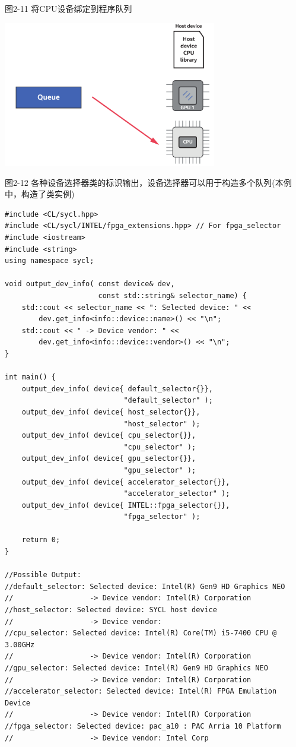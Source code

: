 \hspace*{\fill} \par %
图2-11 将CPU设备绑定到程序队列
\begin{center}
	\includegraphics[width=0.7\textwidth]{content/chapter-2/images/7}
\end{center}

\hspace*{\fill} \par %
图2-12 各种设备选择器类的标识输出，设备选择器可以用于构造多个队列(本例中，构造了类实例)
\begin{lstlisting}[caption={}]
#include <CL/sycl.hpp>
#include <CL/sycl/INTEL/fpga_extensions.hpp> // For fpga_selector
#include <iostream>
#include <string>
using namespace sycl;

void output_dev_info( const device& dev, 
					  const std::string& selector_name) {
	std::cout << selector_name << ": Selected device: " <<
		dev.get_info<info::device::name>() << "\n";
	std::cout << " -> Device vendor: " <<
		dev.get_info<info::device::vendor>() << "\n";
}

int main() {
	output_dev_info( device{ default_selector{}}, 
							"default_selector" );
	output_dev_info( device{ host_selector{}}, 
							"host_selector" );
	output_dev_info( device{ cpu_selector{}}, 
							"cpu_selector" );
	output_dev_info( device{ gpu_selector{}}, 
							"gpu_selector" );
	output_dev_info( device{ accelerator_selector{}},
							"accelerator_selector" );
	output_dev_info( device{ INTEL::fpga_selector{}}, 
							"fpga_selector" );
	
	return 0;
}

//Possible Output:
//default_selector: Selected device: Intel(R) Gen9 HD Graphics NEO
//					-> Device vendor: Intel(R) Corporation
//host_selector: Selected device: SYCL host device
//					-> Device vendor:
//cpu_selector: Selected device: Intel(R) Core(TM) i5-7400 CPU @ 3.00GHz
//					-> Device vendor: Intel(R) Corporation
//gpu_selector: Selected device: Intel(R) Gen9 HD Graphics NEO
//					-> Device vendor: Intel(R) Corporation
//accelerator_selector: Selected device: Intel(R) FPGA Emulation Device
//					-> Device vendor: Intel(R) Corporation
//fpga_selector: Selected device: pac_a10 : PAC Arria 10 Platform
//					-> Device vendor: Intel Corp
\end{lstlisting}

